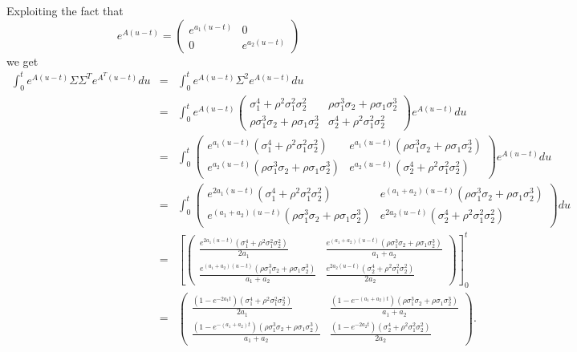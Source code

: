\documentclass[12pt]{article}
\begin{document}
Exploiting the fact that 
\begin{equation*}
e^{A(u-t)} = \left( \begin{array}{cc}
e^{a_1(u-t)} & 0  \\
0 & e^{a_2(u-t)}  \end{array} \right)
\end{equation*}
we get
\begin{eqnarray*}
\int_{0}^{t}  e^{A(u-t)}\Sigma \Sigma^T e^{A^T (u-t)} du & = & \int_{0}^{t}  e^{A(u-t)}\Sigma^2 e^{A (u-t)} du \\
& = & \int_{0}^{t}  
e^{A(u-t)}
\left( \begin{array}{cc}
\sigma_1^4 + \rho^2 \sigma_1^2 \sigma_2^2 & \rho \sigma_1^3 \sigma_2 + \rho \sigma_1 \sigma_2^3  \\
\rho \sigma_1^3 \sigma_2 + \rho \sigma_1 \sigma_2^3  & \sigma_2^4 + \rho^2 \sigma_1^2 \sigma_2^2 \end{array} \right)
 e^{A(u-t)} 
 du \\
 & = & \int_{0}^{t}  \left( \begin{array}{cc}
e^{a_1(u-t)} (\sigma_1^4 + \rho^2 \sigma_1^2 \sigma_2^2 ) & e^{a_1(u-t)} (\rho \sigma_1^3 \sigma_2 + \rho \sigma_1 \sigma_2^3)  \\
 e^{a_2(u-t)} ( \rho \sigma_1^3 \sigma_2 + \rho \sigma_1 \sigma_2^3 ) & e^{a_2(u-t)} (\sigma_2^4 + \rho^2 \sigma_1^2 \sigma_2^2 ) \end{array} \right)
e^{A(u-t)}
 du \\
 & = & \int_{0}^{t}  \left( \begin{array}{cc}
e^{2a_1(u-t)} (\sigma_1^4 + \rho^2 \sigma_1^2 \sigma_2^2 ) & e^{(a_1 + a_2)(u-t)} (\rho \sigma_1^3 \sigma_2 + \rho \sigma_1 \sigma_2^3)  \\
e^{(a_1 + a_2)(u-t)} (\rho \sigma_1^3 \sigma_2 + \rho \sigma_1 \sigma_2^3) & e^{2 a_2(u-t)} (\sigma_2^4 + \rho^2 \sigma_1^2 \sigma_2^2 ) \end{array} \right)
 du \\
  & = & \left[ \left( \begin{array}{cc}
\frac{ e^{2a_1(u-t)} (\sigma_1^4 + \rho^2 \sigma_1^2 \sigma_2^2 ) }{2 a_1} & \frac{ e^{(a_1 + a_2)(u-t)} (\rho \sigma_1^3 \sigma_2 + \rho \sigma_1 \sigma_2^3) }{a_1 + a_2}  \\
\frac{ e^{(a_1 + a_2)(u-t)} (\rho \sigma_1^3 \sigma_2 + \rho \sigma_1 \sigma_2^3) }{a_1 + a_2} & \frac{ e^{2 a_2(u-t)} (\sigma_2^4 + \rho^2 \sigma_1^2 \sigma_2^2 ) }{2 a_2}  \end{array} \right) \right ]_0^t \\
 & = &  \left( \begin{array}{cc}
\frac{(1- e^{-2a_1 t}) (\sigma_1^4 + \rho^2 \sigma_1^2 \sigma_2^2 ) }{2 a_1} & \frac{(1 - e^{-(a_1 + a_2) t}) (\rho \sigma_1^3 \sigma_2 + \rho \sigma_1 \sigma_2^3) }{a_1 + a_2}  \\
\frac{(1 - e^{ -(a_1 +a_2) t}) (\rho \sigma_1^3 \sigma_2 + \rho \sigma_1 \sigma_2^3) }{a_1 + a_2} & \frac{ (1 - e^{-2 a_2 t}) (\sigma_2^4 + \rho^2 \sigma_1^2 \sigma_2^2 ) }{2 a_2}  \end{array} \right) .
\end{eqnarray*} 
\end{document}

